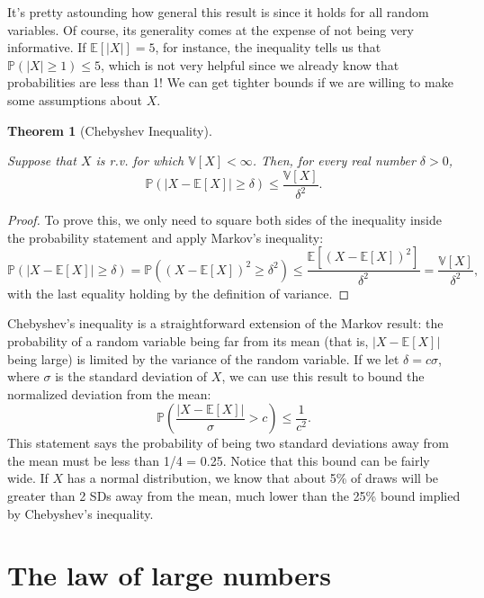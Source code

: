 \documentclass[
  letterpaper,
  DIV=11,
  numbers=noendperiod]{scrreprt}
\newcommand{\E}{\mathbb{E}}
\newcommand{\V}{\mathbb{V}}
\renewcommand{\P}{\mathbb{P}}
\theoremstyle{definition}
\theoremstyle{definition}
\theoremstyle{plain}
\newtheorem{theorem}{Theorem}[chapter]
\theoremstyle{remark}
\begin{document}
It's pretty astounding how general this result is since it holds for all
random variables. Of course, its generality comes at the expense of not
being very informative. If \(\E[|X|] = 5\), for instance, the inequality
tells us that \(\P(|X| \geq 1) \leq 5\), which is not very helpful since
we already know that probabilities are less than 1! We can get tighter
bounds if we are willing to make some assumptions about \(X\).

\begin{theorem}[Chebyshev
Inequality]\protect\hypertarget{thm-chebyshev}{}\label{thm-chebyshev}

Suppose that \(X\) is r.v. for which \(\V[X] < \infty\). Then, for every
real number \(\delta > 0\), \[
\P(|X-\E[X]| \geq \delta) \leq \frac{\V[X]}{\delta^2}.
\]

\end{theorem}

\begin{proof}

To prove this, we only need to square both sides of the inequality
inside the probability statement and apply Markov's inequality: \[
\P\left( |X - \E[X]| \geq \delta \right) = \P((X-\E[X])^2 \geq \delta^2) \leq \frac{\E[(X - \E[X])^2]}{\delta^2} = \frac{\V[X]}{\delta^2},
\] with the last equality holding by the definition of variance.

\end{proof}

Chebyshev's inequality is a straightforward extension of the Markov
result: the probability of a random variable being far from its mean
(that is, \(|X-\E[X]|\) being large) is limited by the variance of the
random variable. If we let \(\delta = c\sigma\), where \(\sigma\) is the
standard deviation of \(X\), we can use this result to bound the
normalized deviation from the mean: \[
\P\left(\frac{|X - \E[X]|}{\sigma} > c \right) \leq \frac{1}{c^2}.
\] This statement says the probability of being two standard deviations
away from the mean must be less than 1/4 = 0.25. Notice that this bound
can be fairly wide. If \(X\) has a normal distribution, we know that
about 5\% of draws will be greater than 2 SDs away from the mean, much
lower than the 25\% bound implied by Chebyshev's inequality.

\hypertarget{the-law-of-large-numbers}{%
\section{The law of large numbers}\label{the-law-of-large-numbers}}
\end{document}
